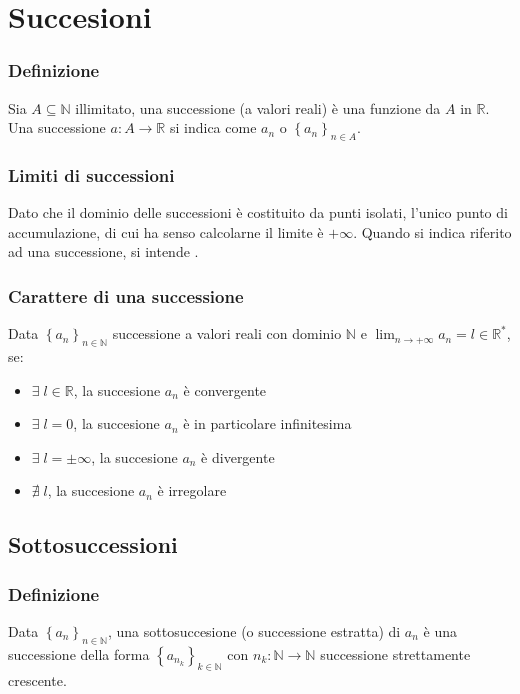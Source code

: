 \documentclass[a4paper]{article}
\begin{document}
\newpage


\section{Succesioni}
\subsubsection*{Definizione}
Sia \(A \subseteq \mathbb{N}\) illimitato, una successione (a valori reali) è una funzione da \(A\) in \(\mathbb{R}\). \\
Una successione \(a : A \to \mathbb{R}\) si indica come \(a_n\) o \(\left\{ a_n \right\}_{n \in A}\).

\subsubsection*{Limiti di successioni}
Dato che il dominio delle successioni è costituito da punti isolati, l'unico punto di accumulazione, di cui ha senso calcolarne
il limite è \(+\infty\). Quando si indica  riferito ad una successione, si intende .

\subsubsection*{Carattere di una successione}
Data \(\left\{ a_n \right\}_{n \in \mathbb{N}}\) successione a valori reali con dominio \(\mathbb{N}\) e \(\displaystyle \lim_{n \to +\infty} a_n = l \in \mathbb{R}^*\), se:
\begin{itemize}
	\item \(\exists \; l \in \mathbb{R}\), la succesione \(a_n\) è convergente
	\item \(\exists \; l = 0\), la succesione \(a_n\) è in particolare infinitesima
	\item \(\exists \; l = \pm \infty\), la succesione \(a_n\) è divergente
	\item \(\nexists \; l\), la succesione \(a_n\) è irregolare
\end{itemize}

\subsection{Sottosuccessioni}
\subsubsection*{Definizione}
Data \(\left\{ a_n \right\}_{n \in \mathbb{N}}\), una sottosuccesione (o successione estratta) di \(a_n\) è una successione della forma \(\left\{ a_{n_k} \right\}_{k \in \mathbb{N}}\)
con \(n_k : \mathbb{N} \to \mathbb{N}\) successione strettamente crescente.
\end{document}
